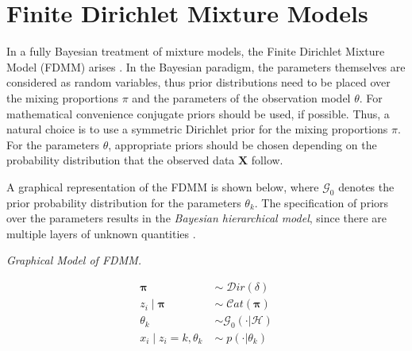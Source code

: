 \section{Finite Dirichlet Mixture Models} \label{back-fdmm-s}
In a fully Bayesian treatment of mixture models, the Finite Dirichlet Mixture Model (FDMM) arises \citep{Diebolt1994}. In the Bayesian paradigm, the parameters themselves are considered as random variables, thus prior distributions need to be placed over the mixing proportions $\pi$ and the parameters of the observation model $\theta$. For mathematical convenience conjugate priors should be used, if possible. Thus, a natural choice is to use a symmetric Dirichlet prior for the mixing proportions $\pi$. For the parameters $\theta$, appropriate priors should be chosen depending on the probability distribution that the observed data $\mathbf{X}$ follow.

A graphical representation of the FDMM is shown below, where $\mathcal{G}_{0}$ denotes the prior probability distribution for the parameters $\theta_{k}$. The specification of priors over the parameters results in the \emph{Bayesian hierarchical model}, since there are multiple layers of unknown quantities \cite{Richardson1997}. 

\vspace*{5mm}
\begin{minipage}{0.6\textwidth}%
  \hfill
  \begin{center}
	
	\emph{Graphical Model of FDMM.}
  \end{center}
\end{minipage}
\begin{minipage}{0.1\textwidth}%
  \begin{equation*}
  	\begin{aligned}
  		\mathbf{\pi} \; & \sim \; \mathcal{D}ir(\delta) \\
  		z_{i} \mid \mathbf{\pi} \; & \sim \; \mathcal{C}at(\mathbf{\pi}) \\
  		\theta_{k} \; & \sim \mathcal{G}_{0}(\cdot | \mathcal{H}) \\
  		x_{i} \mid z_{i}=k,\theta_{k} \; & \sim \; p(\cdot | \theta_{k})  
  	\end{aligned} 
  \end{equation*} 
\end{minipage}
\vspace*{5mm}


